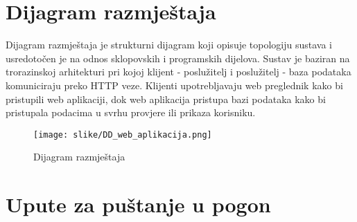 		
		\section{Dijagram razmještaja}
			
%			

		Dijagram razmještaja je strukturni dijagram koji opisuje topologiju sustava i usredotočen je na odnos sklopovskih i programskih dijelova. Sustav je baziran na trorazinskoj arhitekturi pri kojoj klijent - poslužitelj i poslužitelj - baza podataka komuniciraju preko HTTP veze. Klijenti upotrebljavaju web preglednik kako bi pristupili web aplikaciji, dok web aplikacija pristupa bazi podataka kako bi pristupala podacima u svrhu provjere ili prikaza korisniku.

				\begin{figure}[H]
					\texttt{[image: slike/DD\_web\_aplikacija.png]}
					\centering
					\caption{Dijagram razmještaja}
					\label{fig:dig_razmjestaja}
				\end{figure}
			
			\eject 
		
		\section{Upute za puštanje u pogon}
		
%		
%			
%			
			
			
			\eject 